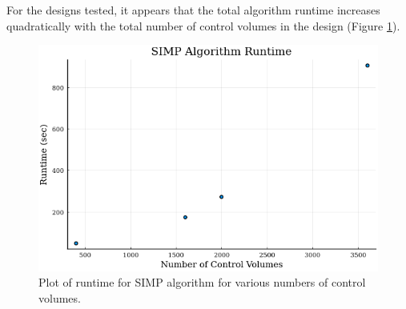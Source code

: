 For the designs tested, it appears that the total algorithm runtime increases quadratically with the total number of control volumes in the design (Figure \ref{fig:runtime}).

\begin{figure}
	\centering
	\includegraphics[width=0.8\linewidth]{Chapter_III_Implementation_and_Results/Images/SIMP-Runtime.png}
	\caption[SIMP Runtime Plot]{Plot of runtime for SIMP algorithm for various numbers of control volumes.}
	\label{fig:runtime}
\end{figure}